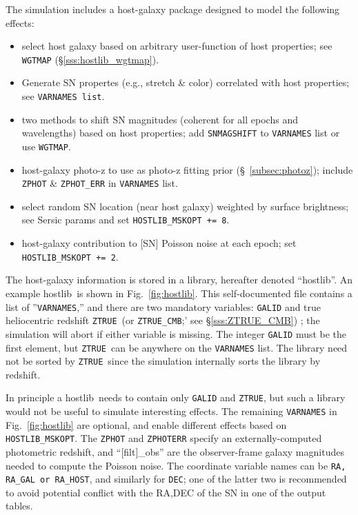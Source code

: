 \documentclass[12pt]{article}
\newcommand{\hostlib}{{\sc hostlib}}
\newcommand{\ztrue}{{\tt ZTRUE}}
\begin{document}
{The simulation includes a host-galaxy
package designed to model the following effects:
\begin{itemize}
%
  \item select host galaxy based on arbitrary user-function
        of host properties; see {\tt WGTMAP} (\S\ref{sss:hostlib_wgtmap}).
%
  \item Generate SN propertes (e.g., stretch \& color) correlated
        with host properties; see {\tt VARNAMES list}.
%
  \item two methods to shift SN magnitudes 
        (coherent for all epochs and wavelengths) 
        based on host properties;
	add {\tt SNMAGSHIFT} to  {\tt VARNAMES} list or use {\tt WGTMAP}.
%
  \item host-galaxy photo-z to use as photo-z fitting prior 
    (\S~\ref{subsec:photoz});
    include {\tt ZPHOT} \& {\tt ZPHOT\_ERR} in {\tt VARNAMES} list.	
%
  \item select random SN location (near host galaxy)
    weighted by surface brightness; see Sersic params
    and set {\tt HOSTLIB\_MSKOPT += 8}.
%
  \item host-galaxy contribution to [SN] Poisson noise at each epoch;
    set {\tt HOSTLIB\_MSKOPT += 2}.
%
\end{itemize} 

The host-galaxy information is stored in a library,
hereafter denoted ``{\hostlib}''. An example \hostlib\
is shown in Fig.~\ref{fig:hostlib}.
This self-documented file contains a list of ''{\tt VARNAMES},''  
and there are two mandatory variables: {\tt GALID} and 
true heliocentric redshift \ztrue\ 
(or {\tt ZTRUE\_CMB};' see \S\ref{sss:ZTRUE_CMB}) ; 
the simulation will abort if either variable is missing. 
The integer {\tt GALID} must be the first element,
but \ztrue\ can be anywhere on the {\tt VARNAMES} list.
The library need not be sorted by \ztrue\ since
the simulation internally sorts the library by redshift.

In principle a \hostlib\ needs to contain only
{\tt GALID} and \ztrue, but such a library would
not be useful to simulate interesting effects.
The remaining {\tt VARNAMES} in Fig.~\ref{fig:hostlib}
are optional, and enable different effects based on {\tt HOSTLIB\_MSKOPT}.
The {\tt ZPHOT} and {\tt ZPHOTERR} specify 
an externally-computed photometric redshift, 
and ``[filt]\_obs'' are the observer-frame galaxy
magnitudes needed to compute the Poisson noise.
The coordinate variable names can be {\tt RA, RA\_GAL or RA\_HOST},
and similarly for {\tt DEC}; one of the latter two is recommended
to avoid potential conflict with the RA,DEC of the SN in one of the
output tables.

}
\end{document}
